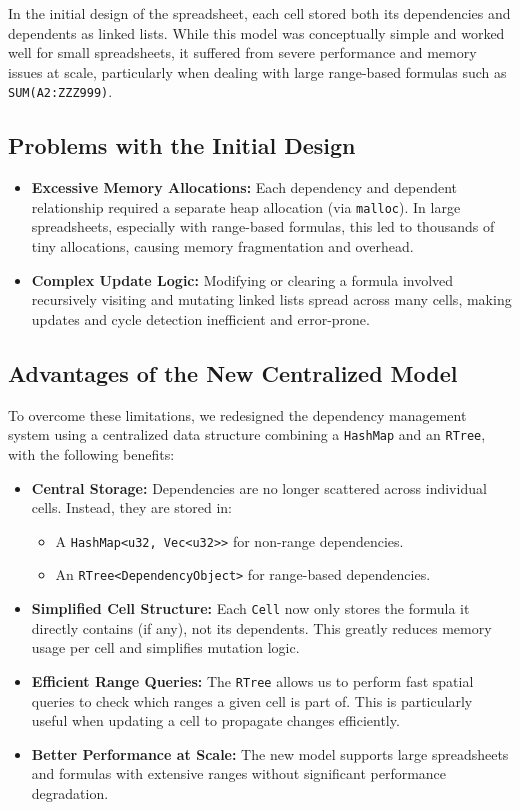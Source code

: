 \documentclass[12pt]{article}
\begin{document}
In the initial design of the spreadsheet, each cell stored both its dependencies and dependents as linked lists. While this model was conceptually simple and worked well for small spreadsheets, it suffered from severe performance and memory issues at scale, particularly when dealing with large range-based formulas such as \texttt{SUM(A2:ZZZ999)}.

\subsection{Problems with the Initial Design}
\begin{itemize}
    \item \textbf{Excessive Memory Allocations:} Each dependency and dependent relationship required a separate heap allocation (via \texttt{malloc}). In large spreadsheets, especially with range-based formulas, this led to thousands of tiny allocations, causing memory fragmentation and overhead.
    
    \item \textbf{Complex Update Logic:} Modifying or clearing a formula involved recursively visiting and mutating linked lists spread across many cells, making updates and cycle detection inefficient and error-prone.
\end{itemize}

\subsection{Advantages of the New Centralized Model}
To overcome these limitations, we redesigned the dependency management system using a centralized data structure combining a \texttt{HashMap} and an \texttt{RTree}, with the following benefits:

\begin{itemize}
    \item \textbf{Central Storage:} Dependencies are no longer scattered across individual cells. Instead, they are stored in:
    \begin{itemize}
        \item A \texttt{HashMap<u32, Vec<u32>>} for non-range dependencies.
        \item An \texttt{RTree<DependencyObject>} for range-based dependencies.
    \end{itemize}
    
    \item \textbf{Simplified Cell Structure:} Each \texttt{Cell} now only stores the formula it directly contains (if any), not its dependents. This greatly reduces memory usage per cell and simplifies mutation logic.
    
    \item \textbf{Efficient Range Queries:} The \texttt{RTree} allows us to perform fast spatial queries to check which ranges a given cell is part of. This is particularly useful when updating a cell to propagate changes efficiently.
    
    \item \textbf{Better Performance at Scale:} The new model supports large spreadsheets and formulas with extensive ranges without significant performance degradation.
\end{itemize}
\end{document}
